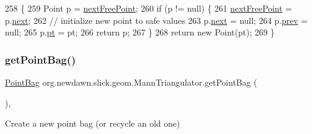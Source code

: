 \begin{DoxyCode}
258                                         \{
259         Point p = \mbox{\hyperlink{classorg_1_1newdawn_1_1slick_1_1geom_1_1_mann_triangulator_a118a96eab8295cfebe18ec95b0236640}{nextFreePoint}};
260         \textcolor{keywordflow}{if} (p != null) \{
261             \mbox{\hyperlink{classorg_1_1newdawn_1_1slick_1_1geom_1_1_mann_triangulator_a118a96eab8295cfebe18ec95b0236640}{nextFreePoint}} = p.\mbox{\hyperlink{classorg_1_1newdawn_1_1slick_1_1geom_1_1_mann_triangulator_1_1_point_a5679974de3d6ea0e554138b1d4e19123}{next}};
262             \textcolor{comment}{// initialize new point to safe values}
263             p.\mbox{\hyperlink{classorg_1_1newdawn_1_1slick_1_1geom_1_1_mann_triangulator_1_1_point_a5679974de3d6ea0e554138b1d4e19123}{next}} = null;
264             p.\mbox{\hyperlink{classorg_1_1newdawn_1_1slick_1_1geom_1_1_mann_triangulator_1_1_point_aada0547222c51b32a918839db2eca9f2}{prev}} = null;
265             p.\mbox{\hyperlink{classorg_1_1newdawn_1_1slick_1_1geom_1_1_mann_triangulator_1_1_point_afd78802a3fe9d6abf60a218d24be56aa}{pt}} = pt;
266             \textcolor{keywordflow}{return} p;
267         \}
268         \textcolor{keywordflow}{return} \textcolor{keyword}{new} Point(pt);
269     \}
\end{DoxyCode}
\mbox{\label{classorg_1_1newdawn_1_1slick_1_1geom_1_1_mann_triangulator_abff661e95ea77ddb64a185bd989ee933}} 
\subsubsection{\texorpdfstring{get\+Point\+Bag()}{getPointBag()}}
{\footnotesize\ttfamily \mbox{\hyperlink{classorg_1_1newdawn_1_1slick_1_1geom_1_1_mann_triangulator_1_1_point_bag}{Point\+Bag}} org.\+newdawn.\+slick.\+geom.\+Mann\+Triangulator.\+get\+Point\+Bag (\begin{DoxyParamCaption}{ }\end{DoxyParamCaption})\hspace{0.3cm}{\ttfamily [inline]}, {\ttfamily [private]}}

Create a new point bag (or recycle an old one)

